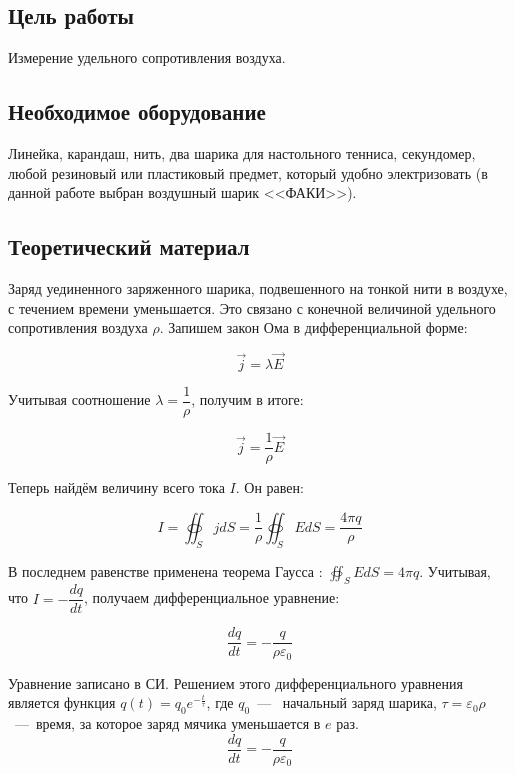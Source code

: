 \documentclass[a4paper, 12pt]{article}
\begin{document}
\subsection*{Цель работы}
Измерение удельного сопротивления воздуха.

\subsection*{Необходимое оборудование}
Линейка, карандаш, нить, два шарика для настольного тенниса, секундомер, любой резиновый или пластиковый предмет, который удобно электризовать (в данной работе выбран воздушный шарик <<ФАКИ>>).

\subsection*{Теоретический материал}

Заряд уединенного заряженного шарика, подвешенного на тонкой нити в воздухе, с течением времени уменьшается. Это связано с конечной величиной удельного сопротивления воздуха $\rho$. Запишем закон Ома в дифференциальной форме:

\begin{equation}
\vec{j} = \lambda \vec{E}
\end{equation}

Учитывая соотношение $\lambda = \dfrac{1}{\rho}$, получим в итоге:

\begin{equation}
\vec{j} = \frac{1}{\rho}\vec{E}
\end{equation}

Теперь найдём величину всего тока $I$. Он равен:

\begin{equation}
I = \oiint_S j dS = \frac{1}{\rho}\oiint_S E dS = \dfrac{4 \pi q}{\rho}
\end{equation}

В последнем равенстве применена теорема Гаусса : $\oiint_S E dS = 4 \pi q$. Учитывая, что $I = -\dfrac{dq}{dt}$, получаем дифференциальное уравнение:

\begin{equation}
\frac{dq}{dt} = - \frac{q}{\rho \varepsilon_0}
\end{equation}

Уравнение записано в СИ. Решением этого дифференциального уравнения является функция $q(t) = q_0  e^{-\frac{t}{\tau}}$, где $q_0$~---
~начальный заряд шарика, $\tau = \varepsilon_0 \rho$~---~время, за которое заряд мячика уменьшается в $e$ раз. 
\begin{equation}
\frac{dq}{dt} = - \frac{q}{\rho \varepsilon_0}
\end{equation}
\end{document}
